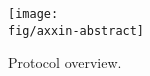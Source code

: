 \begin{figure}[h]
    \centering
    \texttt{[image: \\fig/axxin-abstract]}
    \caption{Protocol overview.}
    \label{fig:axxin-abstract}
\end{figure}